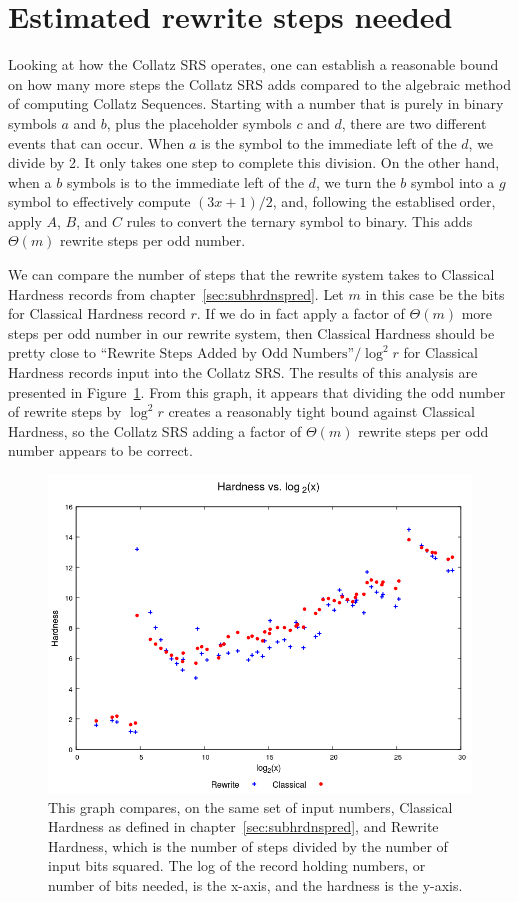 \section{Estimated rewrite steps needed} \label{subsec:estrwsteps}
Looking at how the Collatz SRS operates, one can establish a reasonable bound on how many more steps the Collatz SRS adds compared to the algebraic method of computing Collatz Sequences. Starting with a number that is purely in binary symbols $a$ and $b$, plus the placeholder symbols $c$ and $d$, there are two different events that can occur. When $a$ is the symbol to the immediate left of the $d$, we divide by 2. It only takes one step to complete this division. On the other hand, when a $b$ symbols is to the immediate left of the $d$, we turn the $b$ symbol into a $g$ symbol to effectively compute $(3x+1)/2$, and, following the establised order, apply $A$, $B$, and $C$ rules to convert the ternary symbol to binary. This adds $\Theta(m)$ rewrite steps per odd number. \par
We can compare the number of steps that the rewrite system takes to Classical Hardness records from chapter~\ref{sec:subhrdnspred}. Let $m$ in this case be the bits for Classical Hardness record $r$. If we do in fact apply a factor of $\Theta(m)$ more steps per odd number in our rewrite system, then Classical Hardness should be pretty close to $\text{``Rewrite Steps Added by Odd Numbers''}/\log^2{r}$ for Classical Hardness records input into the Collatz SRS. The results of this analysis are presented in Figure~\ref{fig:rvc_log}. From this graph, it appears that dividing the odd number of rewrite steps by $\log^2{r}$ creates a reasonably tight bound against Classical Hardness, so the Collatz SRS adding a factor of $\Theta(m)$ rewrite steps per odd number appears to be correct.
\begin{figure}
    \centering
    \includegraphics[scale=0.75]{ModAvoidanceAnalysisPics/RvC_vs_log.png}
    \caption{This graph compares, on the same set of input numbers, Classical Hardness as defined in chapter~\ref{sec:subhrdnspred}, and Rewrite Hardness, which is the number of steps divided by the number of input bits squared. The log of the record holding numbers, or number of bits needed, is the x-axis, and the hardness is the y-axis.}
    \label{fig:rvc_log}
\end{figure}


